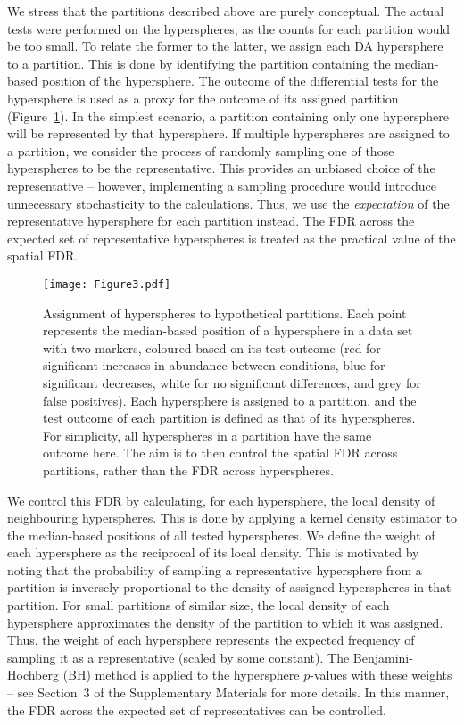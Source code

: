 \documentclass{article}
\newcommand{\suppfdr}{3}
\begin{document}
We stress that the partitions described above are purely conceptual.
The actual tests were performed on the hyperspheres, as the counts for each partition would be too small.
To relate the former to the latter, we assign each DA hypersphere to a partition.
This is done by identifying the partition containing the median-based position of the hypersphere.
The outcome of the differential tests for the hypersphere is used as a proxy for the outcome of its assigned partition (Figure~\ref{fig:fdrdemo}).
In the simplest scenario, a partition containing only one hypersphere will be represented by that hypersphere.
If multiple hyperspheres are assigned to a partition, we consider the process of randomly sampling one of those hyperspheres to be the representative.
This provides an unbiased choice of the representative -- however, implementing a sampling procedure would introduce unnecessary stochasticity to the calculations.
Thus, we use the \textit{expectation} of the representative hypersphere for each partition instead.
The FDR across the expected set of representative hyperspheres is treated as the practical value of the spatial FDR.  

\begin{figure}[bt]
    \begin{center}
        \texttt{[image: Figure3.pdf]}
    \end{center}
    \caption{
        Assignment of hyperspheres to hypothetical partitions.
        Each point represents the median-based position of a hypersphere in a data set with two markers, coloured based on its test outcome
        (red for significant increases in abundance between conditions, blue for significant decreases, white for no significant differences, and grey for false positives).
        Each hypersphere is assigned to a partition, and the test outcome of each partition is defined as that of its hyperspheres.
        For simplicity, all hyperspheres in a partition have the same outcome here.
        The aim is to then control the spatial FDR across partitions, rather than the FDR across hyperspheres.
    }
    \label{fig:fdrdemo}
\end{figure}

We control this FDR by calculating, for each hypersphere, the local density of neighbouring hyperspheres.
This is done by applying a kernel density estimator to the median-based positions of all tested hyperspheres.
We define the weight of each hypersphere as the reciprocal of its local density.
This is motivated by noting that the probability of sampling a representative hypersphere from a partition is inversely proportional to the density of assigned hyperspheres in that partition.
For small partitions of similar size, the local density of each hypersphere approximates the density of the partition to which it was assigned.
Thus, the weight of each hypersphere represents the expected frequency of sampling it as a representative (scaled by some constant).
The Benjamini-Hochberg (BH) method is applied to the hypersphere $p$-values with these weights -- see Section~\suppfdr{} of the Supplementary Materials for more details.
In this manner, the FDR across the expected set of representatives can be controlled.
\end{document}
